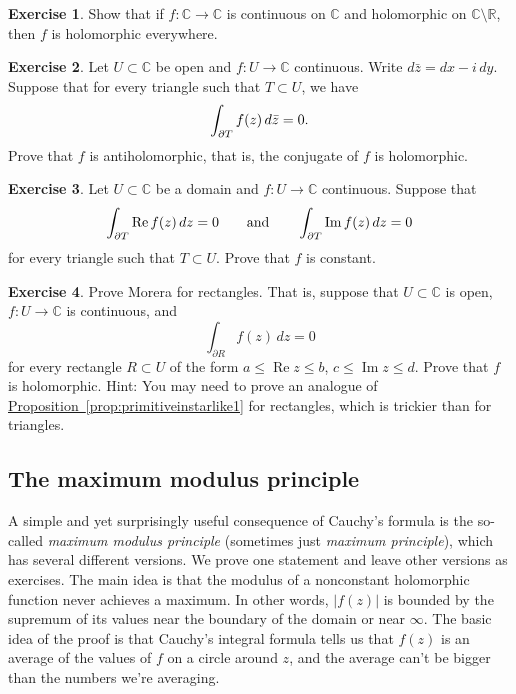 \documentclass[12pt,openany]{book}
\newcommand{\avoidbreak}{\postdisplaypenalty=100}
\renewcommand{\Re}{\operatorname{Re}}
\renewcommand{\Im}{\operatorname{Im}}
\newcommand{\sabs}[1]{\lvert {#1} \rvert}
\newcommand{\C}{{\mathbb{C}}}
\newcommand{\R}{{\mathbb{R}}}
\theoremstyle{plain}
\theoremstyle{remark}
\theoremstyle{definition}
\newenvironment{exbox}{%
    \def\FrameCommand{\vrule width 1pt \relax\hspace{10pt}}%
    \MakeFramed{\advance\hsize-\width\FrameRestore}%
}{%
    \endMakeFramed
}
\theoremstyle{exercise}
\newtheorem{exercise}{Exercise}[section]
\theoremstyle{example}
\newcommand{\propref}[1]{\hyperref[#1]{Proposition~\ref*{#1}}}
\begin{document}
\begin{exbox}
\begin{exercise}
Show that if $f \colon \C \to \C$ is continuous on $\C$
and holomorphic on $\C
\setminus \R$, then $f$ is holomorphic everywhere.
\end{exercise}

\begin{exercise}
Let $U \subset \C$ be open and $f \colon U \to \C$ continuous.
Write $d\bar{z} = dx - i \, dy$.
Suppose that 
for every triangle such that $T \subset U$, we have
\begin{equation*}
\int_{\partial T} f(z) \, d\bar{z} = 0 .
\avoidbreak
\end{equation*}
Prove that $f$
is antiholomorphic, that is, the conjugate of $f$ is holomorphic.
\end{exercise}

\begin{exercise}
Let $U \subset \C$ be a domain and $f \colon U \to \C$ continuous.
Suppose that
\begin{equation*}
\int_{\partial T} \Re f(z) \, dz = 0
\qquad \text{and} \qquad
\int_{\partial T} \Im f(z) \, dz = 0
\avoidbreak
\end{equation*}
for every triangle such that $T \subset U$.  Prove that $f$ is constant.
\end{exercise}

\begin{exercise}
Prove Morera for rectangles.  That is, suppose that $U \subset \C$ is open,
$f \colon U \to \C$ is continuous,
and
\begin{equation*}
\int_{\partial R} f(z) \, dz = 0
\end{equation*}
for every rectangle $R \subset U$ of the form
$a \leq \Re z \leq b$, $c \leq \Im z \leq d$.
Prove that $f$ is holomorphic.
Hint:  You may need to prove an analogue of
\propref{prop:primitiveinstarlike1} for rectangles, which is trickier than
for triangles.
\end{exercise}
\end{exbox}

\subsection{The maximum modulus principle}

A simple and yet surprisingly useful consequence of Cauchy's formula is the
so-called \emph{maximum modulus principle}
(sometimes just \emph{maximum principle}),
which has several different versions.
We prove one statement and leave other versions as exercises.
The main idea is that the modulus of a nonconstant holomorphic function never
achieves a maximum.  In other words, $\sabs{f(z)}$ is bounded
by the supremum of its values near the boundary of the domain or near
$\infty$.
The basic idea of the proof is that Cauchy's integral formula tells us that
$f(z)$ is an average of the values of $f$ on a circle around $z$, and the
average can't be bigger than the numbers we're averaging.
\end{document}
